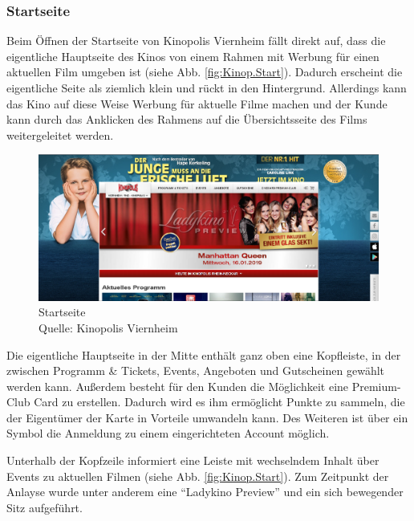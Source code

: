 	\subsubsection{Startseite}
	Beim Öffnen der Startseite von Kinopolis Viernheim fällt direkt auf, dass die eigentliche Hauptseite des Kinos von einem Rahmen mit Werbung für einen aktuellen Film umgeben ist (siehe Abb. \vref{fig:Kinop.Start}). Dadurch erscheint die eigentliche Seite als ziemlich klein und rückt in den Hintergrund. Allerdings kann das Kino auf diese Weise Werbung für aktuelle Filme machen und der Kunde kann durch das Anklicken des Rahmens  auf die Übersichtsseite des Films weitergeleitet werden. 
	\begin{figure}[H]
		\centering 
		\includegraphics[width=14cm]{img/Kinopolis_MA_Startseite.png}
		\captionsetup{format=hang}
		\centering\caption[Startseite]{\label{fig:Kinop.Start}Startseite \\Quelle: Kinopolis Viernheim}
	\end{figure} 
	
	Die eigentliche Hauptseite in der Mitte enthält ganz oben eine Kopfleiste, in der zwischen Programm \& Tickets, Events, Angeboten und Gutscheinen gewählt werden kann. Außerdem besteht für den Kunden die Möglichkeit eine Premium-Club Card zu erstellen. Dadurch wird es ihm ermöglicht Punkte zu sammeln, die der Eigentümer der Karte in Vorteile umwandeln kann. Des Weiteren ist über ein Symbol die Anmeldung zu einem eingerichteten Account möglich. 
	
	Unterhalb der Kopfzeile informiert eine Leiste mit wechselndem Inhalt über Events zu aktuellen Filmen (siehe Abb. \vref{fig:Kinop.Start}). Zum Zeitpunkt der Anlayse wurde unter anderem eine \enquote{Ladykino Preview} und ein sich bewegender Sitz aufgeführt. 
	
